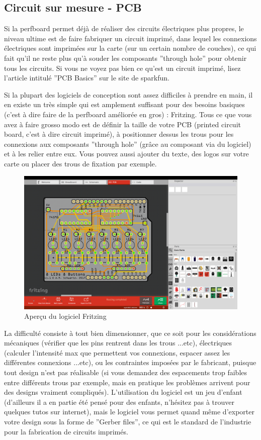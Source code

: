 \documentclass[a4paper, 11pt]{report}
\begin{document}
\subsection{Circuit sur mesure - PCB}
Si la perfboard permet déjà de réaliser des circuits électriques plus
propres, le niveau ultime est de faire fabriquer un circuit imprimé,
dans lequel les connexions électriques sont imprimées sur la carte
(sur un certain nombre de couches), ce qui fait qu'il ne reste plus
qu'à souder les composants ''through hole'' pour obtenir tous les
circuits. Si vous ne voyez pas bien ce qu'est un circuit imprimé,
lisez l'article intitulé ''PCB Basics'' sur le site de sparkfun.

Si la plupart des logiciels de conception sont assez difficiles à
prendre en main, il en existe un très simple qui est amplement suffisant
pour des besoins basiques (c'est à dire faire de la perfboard améliorée
en gros) : Fritzing. Tous ce que vous avez à faire grosso modo est
de définir la taille de votre PCB (printed circuit board, c'est à
dire circuit imprimé), à positionner dessus les trous pour les connexions
aux composants ''through hole'' (grâce au composant via du logiciel)
et à les relier entre eux. Vous pouvez aussi ajouter du texte, des
logos sur votre carte ou placer des trous de fixation par exemple.

\begin{figure}[h]
\caption{Aperçu du logiciel Fritzing}

\centering{}\includegraphics[width=1\textwidth]{images/fritzing}
\end{figure}

La difficulté consiste à tout bien dimensionner, que ce soit pour
les considérations mécaniques (vérifier que les pins rentrent dans
les trous ...etc), électriques (calculer l'intensité max que permettent
vos connexions, espacer assez les différentes connexions ...etc),
ou les contraintes imposées par le fabricant, puisque tout design
n'est pas réalisable (si vous demandez des espacements trop faibles
entre différents trous par exemple, mais en pratique les problèmes
arrivent pour des designs vraiment compliqués). L'utilisation du logiciel
est un jeu d'enfant (d'ailleurs il a en partie été pensé pour des
enfants, n'hésitez pas à trouver quelques tutos sur internet), mais
le logiciel vous permet quand même d'exporter votre design sous la
forme de ''Gerber files'', ce qui est le standard de l'industrie
pour la fabrication de circuits imprimés.
\end{document}
